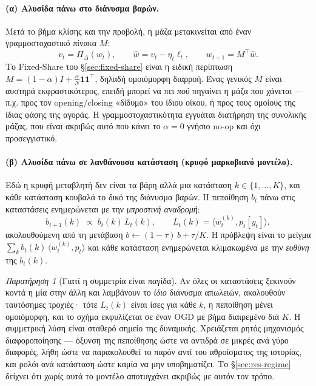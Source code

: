 \documentclass[12pt,a4paper,oneside]{report}
\renewcommand{\_}{\oldunderscore\allowbreak}
\theoremstyle{definition}
\theoremstyle{plain}
\theoremstyle{remark}
\newtheorem{remark}[theorem]{Παρατήρηση}
\begin{document}
\paragraph{(α) Αλυσίδα πάνω στο διάνυσμα βαρών.} Μετά το βήμα κλίσης και την προβολή, η μάζα
μετακινείται από έναν γραμμοστοχαστικό πίνακα $M$:
\[
v_t = \Pi_{\Delta}(w_t), \qquad \hat{w} = v_t - \eta_t \ell_t, \qquad w_{t+1} = M^{\!\top}\hat{w}.
\]
Το Fixed-Share του \S\ref{sec:fixed-share} είναι η ειδική περίπτωση
$M = (1-\alpha)I + \tfrac{\alpha}{N}\mathbf{1}\mathbf{1}^{\!\top}$, δηλαδή ομοιόμορφη διαρροή.
Ένας γενικός $M$ είναι αυστηρά εκφραστικότερος, επειδή μπορεί να πει \emph{πού} πηγαίνει η
μάζα που χάνεται --- π.χ. προς τον opening/closing «δίδυμο» του ίδιου οίκου, ή προς τους
ομοίους της ίδιας φάσης της αγοράς. Η γραμμοστοχαστικότητα εγγυάται διατήρηση της συνολικής
μάζας, που είναι ακριβώς αυτό που κάνει το $\alpha=0$ γνήσιο no-op και όχι προσεγγιστικό.

\paragraph{(β) Αλυσίδα πάνω σε λανθάνουσα κατάσταση (κρυφό μαρκοβιανό μοντέλο).} Εδώ η
κρυφή μεταβλητή δεν είναι τα βάρη αλλά μια κατάσταση $k\in\{1,\dots,K\}$, και κάθε κατάσταση
κουβαλά το δικό της διάνυσμα βαρών. Η πεποίθηση $b_t$ πάνω στις καταστάσεις ενημερώνεται με
την \emph{μπροστινή αναδρομή}:
\[
b_{t+1}(k) \;\propto\; b_t(k)\, L_t(k), \qquad L_t(k) = \langle w^{(k)}_t, p_t[y_t]\rangle,
\]
ακολουθούμενη από τη μετάβαση $b \leftarrow (1-\tau)\,b + \tau/K$. Η πρόβλεψη είναι το
μείγμα $\sum_k b_t(k)\,\langle w^{(k)}_t, p_t\rangle$ και κάθε κατάσταση ενημερώνεται
κλιμακωμένα με την \emph{ευθύνη} της $b_t(k)$.

\begin{remark}[Γιατί η συμμετρία είναι παγίδα]
\label{rem:symmetry}
Αν όλες οι καταστάσεις ξεκινούν κοντά η μία στην άλλη και λαμβάνουν το \emph{ίδιο} διάνυσμα
απωλειών, ακολουθούν ταυτόσημες τροχιές· τότε $L_t(k)$ είναι ίσες για κάθε $k$, η πεποίθηση
μένει ομοιόμορφη, και το σχήμα εκφυλίζεται σε έναν OGD με βήμα διαιρεμένο διά $K$. Η
συμμετρική λύση είναι σταθερό σημείο της δυναμικής. Χρειάζεται ρητός μηχανισμός
διαφοροποίησης --- όξυνση της πεποίθησης ώστε να αντιδρά σε μικρές ανά γύρο διαφορές,
λήθη ώστε να παρακολουθεί το παρόν αντί του αθροίσματος της ιστορίας, και ρολόι ανά
κατάσταση ώστε καμία να μην υποβηματίζει. Το \S\ref{sec:res-regime} δείχνει ότι χωρίς αυτά
το μοντέλο αποτυγχάνει ακριβώς με αυτόν τον τρόπο.
\end{remark}
\end{document}
